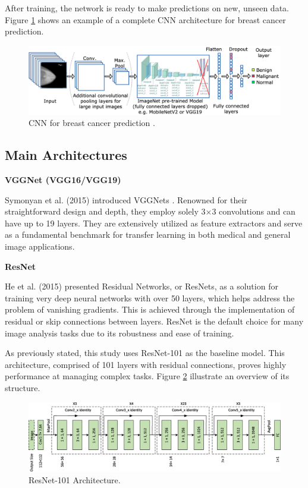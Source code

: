 \documentclass[a4paper,10pt]{book}
\begin{document}
After training, the network is ready to make predictions on new, unseen data. Figure \ref{fig:cnn_breast} shows an example of a complete CNN architecture for breast cancer prediction.

\begin{figure}[h!]
    \centering
    \includegraphics[width=0.9\linewidth]{reports//assets/cnn_breast.png}
    \caption[Breast cancer CNN]{CNN for breast cancer prediction \cite{jaamour_divide_2023}.}
    \label{fig:cnn_breast}
\end{figure}

\subsection{Main Architectures}

\textbf{VGGNet (VGG16/VGG19)}

Symonyan et al. (2015) introduced VGGNets \cite{simonyanVeryDeepConvolutional}. Renowned for their straightforward design and depth, they employ solely 3×3 convolutions and can have up to 19 layers. They are extensively utilized as feature extractors and serve as a fundamental benchmark for transfer learning in both medical and general image applications.

\textbf{ResNet}

He et al. (2015) \cite{he_deep_2015} presented Residual Networks, or ResNets, as a solution for training very deep neural networks with over 50 layers, which helps address the problem of vanishing gradients. This is achieved through the implementation of residual or skip connections between layers. ResNet is the default choice for many image analysis tasks due to its robustness and ease of training.

As previously stated, this study uses ResNet-101 as the baseline model. This architecture, comprised of 101 layers with residual connections, proves highly performance at managing complex tasks. Figure \ref{fig:resnet_101} illustrate an overview of its structure.

\begin{figure}[h!]
    \centering
    \includegraphics[width=0.75\linewidth]{reports//assets/resnet101.jpg}
    \caption[ResNet-101 Architecture]{ResNet-101 Architecture.}
    \label{fig:resnet_101}
\end{figure}
\end{document}
